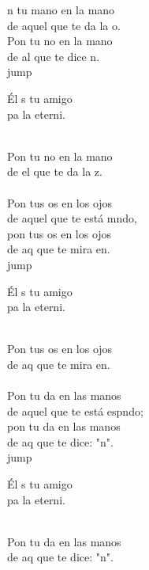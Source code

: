\begin{cancion}%
	n tu mano en la mano \\
	de aquel que te da la o.\\
	Pon tu no en la mano \\
	de al que te dice n.\\jump\\
	\begin{chorus}%
	Él s tu amigo \\
	pa la eterni.\\
	\end{chorus}%
	\jump\\
	Pon tu no en la mano \\
	de el que te da la z.\\
	\jump\\
	Pon tus os en los ojos\\
	de aquel que te está mndo,\\
	pon tus os en los ojos \\
	de aq que te mira en.\\jump\\
	\begin{chorus}%
	Él s tu amigo \\
	pa la eterni.\\
	\end{chorus}%
	\jump\\
	Pon tus os en los ojos \\
	de aq que te mira en.\\
	\jump\\
	Pon tu da en las manos\\
	de aquel que te está espndo;\\
	pon tu da en las manos\\
	de aq que te dice: "n".\\jump\\
	\begin{chorus}%
	Él s tu amigo \\
	pa la eterni.\\
	\end{chorus}%
	\jump\\
	Pon tu da en las manos\\
	de aq que te dice: "n".\\
\end{cancion}%
